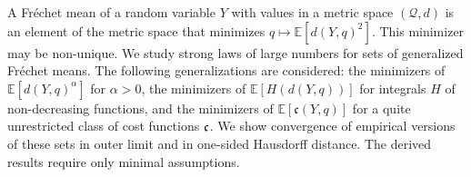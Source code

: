 A Fréchet mean of a random variable $Y$ with values in a metric space $(\mathcal Q, d)$ is an element of the metric space that minimizes $q \mapsto \mathbb E[d(Y,q)^2]$. This minimizer may be non-unique. 
We study strong laws of large numbers for sets of generalized Fréchet means.
The following generalizations are considered: 
the minimizers of $\mathbb E[d(Y, q)^\alpha]$ for $\alpha > 0$,
the minimizers of $\mathbb E[H(d(Y, q))]$ for integrals $H$ of non-decreasing functions, and
the minimizers of $\mathbb E[\mathfrak c(Y, q)]$ for a quite unrestricted class of cost functions $\mathfrak{c}$.
We show convergence of empirical versions of these sets in outer limit and in one-sided Hausdorff distance. The derived results require only minimal assumptions.

